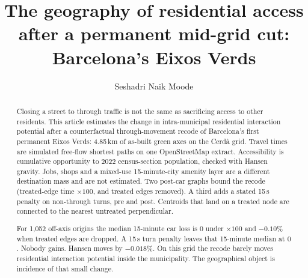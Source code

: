 \documentclass[a4paper,fleqn]{cas-dc}
\begin{document}
\let\WriteBookmarks\relax
\setcounter{topnumber}{3}
\setcounter{dbltopnumber}{2}
\setcounter{bottomnumber}{1}
\setcounter{totalnumber}{4}
\renewcommand{\topfraction}{0.92}
\renewcommand{\dbltopfraction}{0.95}
\renewcommand{\bottomfraction}{0.45}
\renewcommand{\textfraction}{0.05}
\renewcommand{\floatpagefraction}{0.85}
\renewcommand{\dblfloatpagefraction}{0.85}
\setlength{\floatsep}{8pt}
\setlength{\textfloatsep}{10pt}
\setlength{\intextsep}{8pt}
\setlength{\dblfloatsep}{8pt}
\setlength{\dbltextfloatsep}{10pt}
\raggedbottom
\makeatletter
\setlength{\@fptop}{6pt}
\setlength{\@fpsep}{10pt}
\setlength{\@fpbot}{0pt plus 1fil}
\setlength{\@dblfptop}{6pt}
\setlength{\@dblfpsep}{10pt}
\setlength{\@dblfpbot}{0pt plus 1fil}
\makeatother


\title[mode=title]{The geography of residential access after a permanent
mid-grid cut: Barcelona's Eixos Verds}

\author[1]{Seshadri Naik Moode}
\cormark[1]

\begin{abstract}
Closing a street to through traffic is not the same as sacrificing access
to other residents. This article estimates the change in intra-municipal
residential interaction potential after a counterfactual through-movement
recode of Barcelona's first permanent Eixos Verds: 4.85\,km of as-built
green axes on the Cerd\`a grid. Travel times are simulated free-flow
shortest paths on one OpenStreetMap extract. Accessibility is cumulative
opportunity to 2022 census-section population, checked with Hansen gravity.
Jobs, shops and a mixed-use 15-minute-city amenity layer are a different
destination mass and are not estimated. Two post-car graphs bound the recode
(treated-edge time $\times 100$, and treated edges removed). A third adds a
stated 15\,s penalty on non-through turns, pre and post. Centroids that land
on a treated node are connected to the nearest untreated perpendicular.

For 1{,}052 off-axis origins the median 15-minute car loss is $0$ under
$\times 100$ and $-0.10\%$ when treated edges are dropped. A 15\,s turn
penalty leaves that 15-minute median at $0$. Nobody gains. Hansen moves by
$-0.018\%$. On this grid the recode barely moves residential interaction
potential inside the municipality. The geographical object is incidence of
that small change.
\end{abstract}
\end{document}
